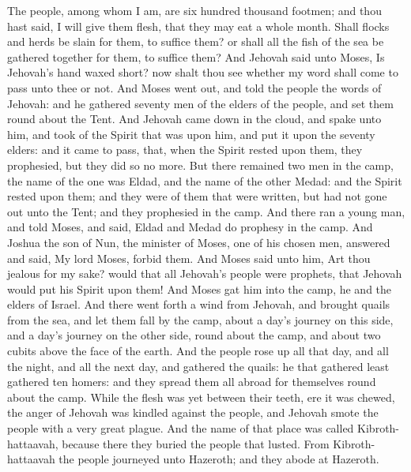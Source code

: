 The people, among whom I am, are six hundred thousand footmen; and thou hast said, I will give them flesh, that they may eat a whole month. Shall flocks and herds be slain for them, to suffice them? or shall all the fish of the sea be gathered together for them, to suffice them? And Jehovah said unto Moses, Is Jehovah’s hand waxed short? now shalt thou see whether my word shall come to pass unto thee or not.  And Moses went out, and told the people the words of Jehovah: and he gathered seventy men of the elders of the people, and set them round about the Tent. And Jehovah came down in the cloud, and spake unto him, and took of the Spirit that was upon him, and put it upon the seventy elders: and it came to pass, that, when the Spirit rested upon them, they prophesied, but they did so no more.  But there remained two men in the camp, the name of the one was Eldad, and the name of the other Medad: and the Spirit rested upon them; and they were of them that were written, but had not gone out unto the Tent; and they prophesied in the camp. And there ran a young man, and told Moses, and said, Eldad and Medad do prophesy in the camp. And Joshua the son of Nun, the minister of Moses, one of his chosen men, answered and said, My lord Moses, forbid them. And Moses said unto him, Art thou jealous for my sake? would that all Jehovah’s people were prophets, that Jehovah would put his Spirit upon them! And Moses gat him into the camp, he and the elders of Israel.  And there went forth a wind from Jehovah, and brought quails from the sea, and let them fall by the camp, about a day’s journey on this side, and a day’s journey on the other side, round about the camp, and about two cubits above the face of the earth. And the people rose up all that day, and all the night, and all the next day, and gathered the quails: he that gathered least gathered ten homers: and they spread them all abroad for themselves round about the camp. While the flesh was yet between their teeth, ere it was chewed, the anger of Jehovah was kindled against the people, and Jehovah smote the people with a very great plague. And the name of that place was called Kibroth-hattaavah, because there they buried the people that lusted. From Kibroth-hattaavah the people journeyed unto Hazeroth; and they abode at Hazeroth. 

